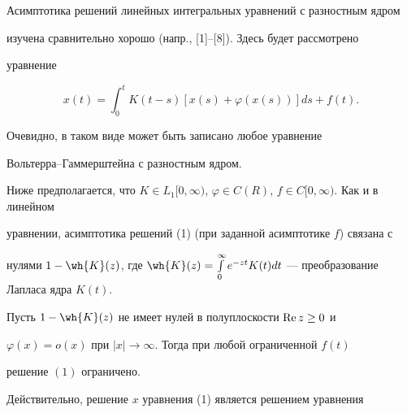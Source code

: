 \pagestyle{plain} %







\maketitle


\label{begin}








Асимптотика решений линейных интегральных уравнений с разностным ядром


изучена сравнительно хорошо (напр., [1]--[8]). Здесь будет рассмотрено


уравнение


\begin{equation}


x(t)=\int_0^t K(t-s) [ x(s)+\varphi(x(s))] ds+f(t).


\end{equation}


Очевидно, в таком виде может быть записано любое уравнение


Вольтерра--Гаммерштейна с разностным ядром.


Ниже предполагается, что $K \in L_1


[0,\infty)$, $\varphi \in C(R)$, $f \in C[0,\infty)$. Как и в линейном


уравнении, асимптотика решений (1) (при заданной асимптотике $f$) связана с


нулями $1-\wh{K}(z)$, где $\wh{K}(z)= \int\limits_0^\infty e^{-zt} K(t)


dt$ --- преобразование Лапласа ядра $K(t)$.





\begin{thm}


Пусть $1-\wh{K}(z)$ не имеет нулей в полуплоскости $\operatorname{Re} z \ge 0$ и


$\varphi (x)=o(x)$ при $|x| \to \infty$. Тогда при любой ограниченной $f(t)$


решение $(1)$ ограничено.


\end{thm}





Действительно, решение $x$ уравнения (1) является решением уравнения


